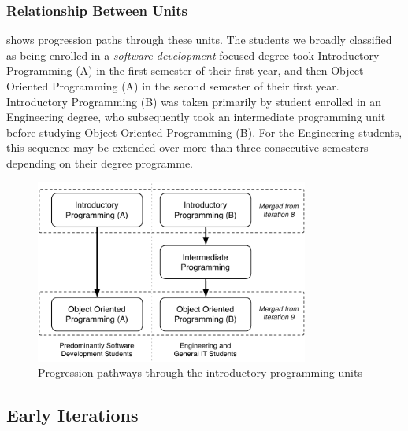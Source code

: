 
\subsubsection{Relationship Between Units} %
\label{ssub:relationship_between_units}

 shows progression paths through these units. The students we broadly classified as being enrolled in a \emph{software development} focused degree took Introductory Programming (A) in the first semester of their first year, and then Object Oriented Programming (A) in the second semester of their first year. Introductory Programming (B) was taken primarily by student enrolled in an Engineering degree, who subsequently took an intermediate programming unit before studying Object Oriented Programming (B). For the Engineering students, this sequence may be extended over more than three consecutive semesters depending on their degree programme.

\begin{figure}[htbp]
  \centering
  \includegraphics[width=0.8\textwidth]{UnitPaths}
  \caption{Progression pathways through the introductory programming units}
  \label{fig:unit_paths}
\end{figure}




\subsection{Early Iterations} %
\label{sub:early_iterations}

